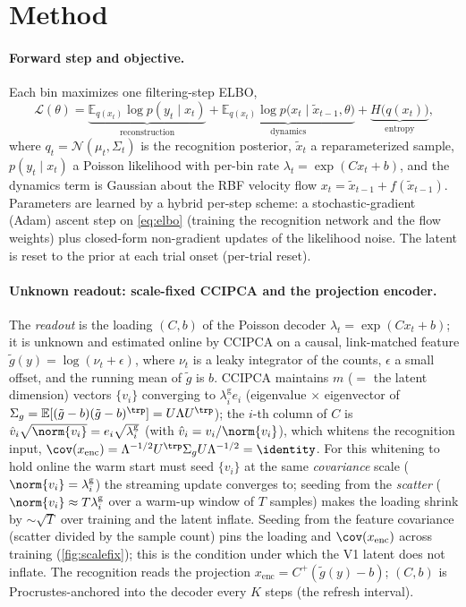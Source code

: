 \documentclass{article}
\newcommand{\Renc}{x_{\mathrm{enc}}}
\newcommand{\E}{\mathbb{E}}
\begin{document}
\section{Method}
\paragraph{Forward step and objective.}
Each bin maximizes one filtering-step ELBO,
\begin{equation}
  \mathcal{L}(\theta) = \underbrace{\E_{q(x_t)}\!\log p(y_t\mid x_t)}_{\text{reconstruction}}
  + \underbrace{\E_{q(x_t)}\!\log p\big(x_t \mid \tilde x_{t-1},\theta\big)}_{\text{dynamics}}
  + \underbrace{H\big(q(x_t)\big)}_{\text{entropy}},
  \label{eq:elbo}
\end{equation}
where $q_t=\mathcal N(\mu_t,\Sigma_t)$ is the recognition posterior, $\tilde x_t$ a
reparameterized sample, $p(y_t\mid x_t)$ a Poisson likelihood with per-bin rate
$\lambda_t=\exp(Cx_t+b)$, and the dynamics term is Gaussian about the RBF velocity flow
$x_t=\tilde x_{t-1}+f(\tilde x_{t-1})$. Parameters are learned by a hybrid per-step scheme: a
stochastic-gradient (Adam) ascent step on \cref{eq:elbo} (training the recognition network
and the flow weights) plus closed-form non-gradient updates of the likelihood noise. The
latent is reset to the prior at each trial onset (per-trial reset).

\paragraph{Unknown readout: scale-fixed CCIPCA and the projection encoder.}
The \emph{readout} is the loading $(C,b)$ of the Poisson decoder $\lambda_t=\exp(Cx_t+b)$; it
is unknown and estimated online by CCIPCA on a causal, link-matched feature
$\tilde g(y)=\log(\nu_t+\epsilon)$, where $\nu_t$ is a leaky integrator of the counts,
$\epsilon$ a small offset, and the running mean of $\tilde g$ is $b$. CCIPCA maintains $m$
($=$ the latent dimension) vectors $\{v_i\}$ converging to $\lambda^{\mathrm g}_i e_i$ (eigenvalue $\times$ eigenvector
of $\Sigma_g=\E[(\tilde g-b)(\tilde g-b)^\trp]=U\Lambda U^\trp$); the $i$-th column of $C$ is
$\hat v_i\sqrt{\norm{v_i}}=e_i\sqrt{\lambda^{\mathrm g}_i}$ (with $\hat v_i=v_i/\norm{v_i}$),
which whitens the recognition input,
$\cov(\Renc)=\Lambda^{-1/2}U^\trp\Sigma_g U\Lambda^{-1/2}=\identity$. For this whitening to
hold online the warm start must seed $\{v_i\}$ at the same \emph{covariance} scale
($\norm{v_i}=\lambda^{\mathrm g}_i$) the streaming update converges to; seeding from the
\emph{scatter} ($\norm{v_i}\approx T\lambda^{\mathrm g}_i$ over a warm-up window of $T$
samples) makes the loading shrink by $\sim\!\sqrt T$ over training and the latent inflate.
Seeding from the feature covariance (scatter divided by the sample count) pins the loading
and $\cov(\Renc)$ across training (\cref{fig:scalefix}); this is the condition under which
the V1 latent does not inflate. The recognition reads the projection
$\Renc=C^{+}(\tilde g(y)-b)$; $(C,b)$ is Procrustes-anchored into the decoder every $K$ steps
(the refresh interval).
\end{document}
